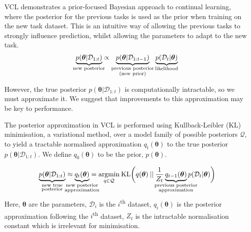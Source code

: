 \documentclass[a4paper,11=0pt]{article}
\let\boldtheta\theta %
\renewcommand{\theta}{\boldsymbol{\boldtheta}} %
\begin{document}
VCL demonstrates a prior-focused Bayesian approach to continual learning, where the posterior for the previous tasks is used as the prior when training on the new task dataset. This is an intuitive way of allowing the previous tasks to strongly influence prediction, whilst allowing the parameters to adapt to the new task. 
\begin{equation}\label{eq:1}
\begin{split}
\underbrace{p(\theta | \mathcal{D}_{1:t})}_{\mathclap{\text{new posterior}}} \propto \underbrace{p(\theta | \mathcal{D}_{1:t-1})}_{\substack{\text{previous posterior}\\ (\text{new prior})}} \underbrace{p(\mathcal{D}_t | \theta)}_{\text{likelihood}}
\end{split}
\end{equation}


However, the true posterior $p(\theta | \mathcal{D}_{1:t})$ is computationally intractable, so we must approximate it. We suggest that improvements to this approximation may be key to performance. 


The posterior approximation in VCL is performed using Kullback-Leibler (KL) minimisation, a variational method, over a model family of possible posteriors $\mathcal{Q}$, to yield a tractable normalised approximation $q_t(\theta)$ to the true posterior $p(\theta | \mathcal{D}_{1:t})$. We define $q_0(\theta)$ to be the prior, $p(\theta)$.

\vspace{-1.7em}
\begin{equation}\label{eq:3}
\begin{split}
\underbrace{p(\theta | \mathcal{D}_{1:t})}_{\mathclap{\substack{\text{new true}\\ \text{posterior}}}}\approx \underbrace{q_t(\theta)}_{\mathclap{\substack{\text{new posterior}\\ \text{approximation}}}} &=\underset{q\in\mathcal{Q}}{\mathrm{arg}\mathrm{min}} \: \mathrm{KL}\bigg(q(\theta)\:||\:\frac{1}{Z_t}\underbrace{q_{t-1}(\theta)}_{\mathclap{\substack{\text{previous posterior} \\ \text{approximation}}}}p(\mathcal{D}_t|\theta) \bigg)\\
\end{split}
\end{equation}
Here, $\theta$ are the parameters, $\mathcal{D}_i$ is the $i$\textsuperscript{th} dataset, $q_i(\theta)$ is the posterior approximation following the $i$\textsuperscript{th} dataset, $Z_t$ is the intractable normalisation constant which is irrelevant for minimisation.
\end{document}
